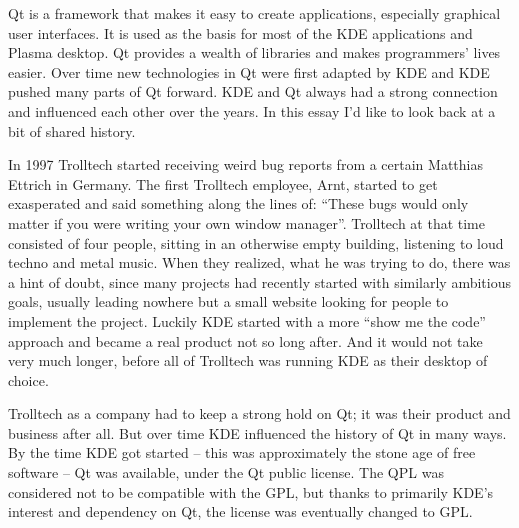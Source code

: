 

\noindent{}Qt is a framework that makes it easy to create applications,
especially graphical user interfaces. It is used as the basis for most of
the KDE applications and Plasma desktop. Qt provides a wealth of libraries
and makes programmers' lives easier. Over time new technologies in Qt were
first adapted by KDE and KDE pushed many parts of Qt forward. KDE and Qt
always had a strong connection and influenced each other over the years. In
this essay I'd like to look back at a bit of shared history.

In 1997 Trolltech started receiving weird bug reports from a certain Matthias
Ettrich in Germany. The first Trolltech employee, Arnt, started to get
exasperated and said something along the lines of: “These bugs would only matter
if you were writing your own window manager”. Trolltech at that time consisted
of four people, sitting in an otherwise empty building, listening to loud techno
and metal music. When they realized, what he was trying to do, there was a hint
of doubt, since many projects had recently started with similarly ambitious
goals, usually leading nowhere but a small website looking for people to
implement the project. Luckily KDE started with a more “show me the code”
approach and became a real product not so long after. And it would not take very
much longer, before all of Trolltech was running KDE as their desktop of choice.

Trolltech as a company had to keep a strong hold on Qt; it was their product and
business after all. But over time KDE influenced the history of Qt in many ways.
By the time KDE got started – this was approximately the stone age of free
software – Qt was available, under the Qt public license. The QPL was considered
not to be compatible with the GPL, but thanks to primarily KDE’s interest and
dependency on Qt, the license was eventually changed to GPL.

